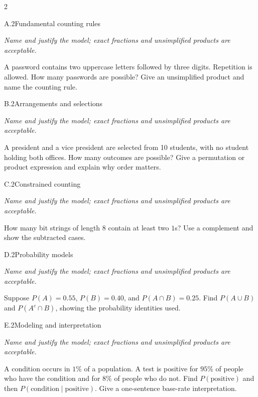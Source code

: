 \documentclass[9pt]{extarticle}
\begin{document}
\begin{multicols}{2}
\begin{CoreProblem}{A.2}{Fundamental counting rules}
{\scriptsize\textit{Name and justify the model; exact fractions and unsimplified products are acceptable.}\par}
A password contains two uppercase letters followed by three digits.
    Repetition is allowed. How many passwords are possible? Give an unsimplified
    product and name the counting rule.
\end{CoreProblem}
\begin{CoreProblem}{B.2}{Arrangements and selections}
{\scriptsize\textit{Name and justify the model; exact fractions and unsimplified products are acceptable.}\par}
A president and a vice president are selected from 10 students, with
    no student holding both offices. How many outcomes are possible? Give a
    permutation or product expression and explain why order matters.
\end{CoreProblem}
\begin{CoreProblem}{C.2}{Constrained counting}
{\scriptsize\textit{Name and justify the model; exact fractions and unsimplified products are acceptable.}\par}
How many bit strings of length 8 contain at least two $1$s? Use a
    complement and show the subtracted cases.
\end{CoreProblem}
\columnbreak
\begin{CoreProblem}{D.2}{Probability models}
{\scriptsize\textit{Name and justify the model; exact fractions and unsimplified products are acceptable.}\par}
Suppose $P(A)=0.55$, $P(B)=0.40$, and $P(A\cap B)=0.25$. Find
    $P(A\cup B)$ and $P(A^c\cap B)$, showing the probability identities used.
\end{CoreProblem}
\begin{CoreProblem}{E.2}{Modeling and interpretation}
{\scriptsize\textit{Name and justify the model; exact fractions and unsimplified products are acceptable.}\par}
A condition occurs in $1\%$ of a population. A test is positive for
    $95\%$ of people who have the condition and for $8\%$ of people who do not.
    Find $P(\text{positive})$ and then
    $P(\text{condition}\mid\text{positive})$. Give a one-sentence base-rate
    interpretation.
\end{CoreProblem}
\end{multicols}
\CoreWorkArea
\FormBreak
{}
\end{document}

